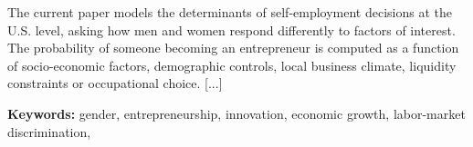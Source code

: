 The current paper models the determinants of self-employment decisions at the U.S. level, asking how men and women respond differently to factors of interest. The probability of someone becoming an entrepreneur is computed as a function of  socio-economic factors, demographic controls, local business climate, liquidity constraints or occupational choice. [...] 

\textbf{Keywords:} gender, entrepreneurship, innovation, economic growth, labor-market discrimination, 

